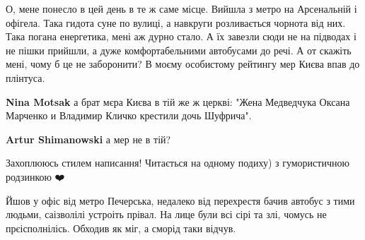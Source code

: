 \begin{itemize}
О, мене понесло в цей день в те ж саме місце. Вийшла з метро на Арсенальній і
офігела. Така гидота суне по вулиці, а навкруги розливається чорнота від них.
Така погана енергетика, мені аж дурно стало.  А їх завезли сюди не на підводах
і не пішки прийшли, а дуже комфортабельними автобусами до речі.  А от скажіть
мені, чому б це не заборонити?  В моєму особистому рейтингу мер Києва впав до
плінтуса.

\begin{itemize}
 
\textbf{Nina Motsak} а брат мєра Києва в тій же ж церкві: "Жена Медведчука Оксана Марченко и Владимир Кличко крестили дочь Шуфрича".

 
\textbf{Artur Shimanowski} а мер не в тій?
\end{itemize}

 
Захоплююсь стилем написання! Читається на одному подиху) з гумористичною родзинкою ❤️

 

Йшов у офіс від метро Печерська, недалеко від перехрестя бачив автобус з тими
людьми, саізволілі устроіть прівал. На лице були всі сірі та злі, чомусь не
прєісполнілісь. Обходив як міг, а сморід таки відчув.


 


\end{itemize}
